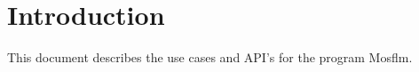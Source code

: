 \documentclass[a4paper, 11pt]{article}
\begin{document}
\section{Introduction}

This document describes the use cases and API's for the program Mosflm.
\end{document}
